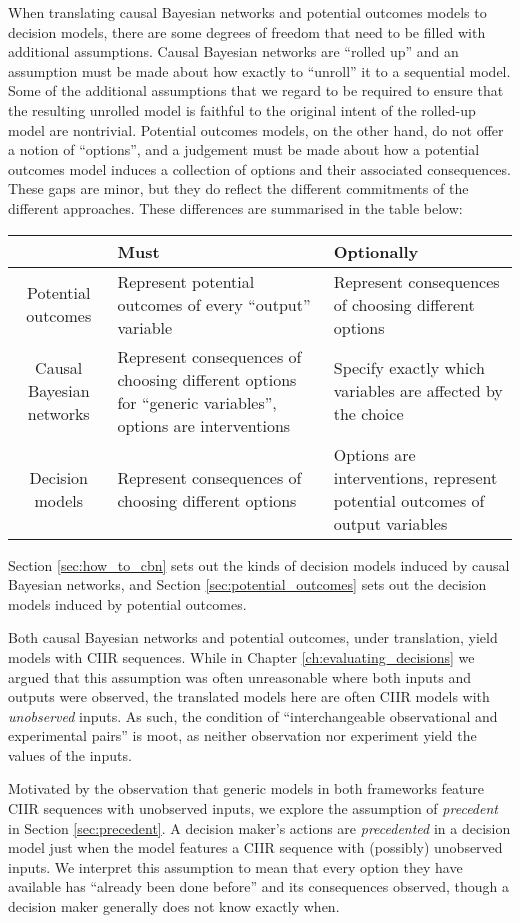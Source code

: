 When translating causal Bayesian networks and potential outcomes models to decision models, there are some degrees of freedom that need to be filled with additional assumptions. Causal Bayesian networks are ``rolled up'' and an assumption must be made about how exactly to ``unroll'' it to a sequential model. Some of the additional assumptions that we regard to be required to ensure that the resulting unrolled model is faithful to the original intent of the rolled-up model are nontrivial. Potential outcomes models, on the other hand, do not offer a notion of ``options'', and a judgement must be made about how a potential outcomes model induces a collection of options and their associated consequences. These gaps are minor, but they do reflect the different commitments of the different approaches. These differences are summarised in the table below:
\begin{center}
\begin{tabular}{ |c|p{5cm}|p{5cm}| } 
 \hline
  & Must & Optionally  \\
 \hline
 Potential outcomes & Represent potential outcomes of every ``output'' variable & Represent consequences of choosing different options \\ 
 Causal Bayesian networks & Represent consequences of choosing different options for ``generic variables'', options are interventions & Specify exactly which variables are affected by the choice \\
 Decision models & Represent consequences of choosing different options & Options are interventions, represent potential outcomes of output variables\\
 \hline
\end{tabular}
\end{center}
Section \ref{sec:how_to_cbn} sets out the kinds of decision models induced by causal Bayesian networks, and Section \ref{sec:potential_outcomes} sets out the decision models induced by potential outcomes.

Both causal Bayesian networks and potential outcomes, under translation, yield models with CIIR sequences. While in Chapter \ref{ch:evaluating_decisions} we argued that this assumption was often unreasonable where both inputs and outputs were observed, the translated models here are often CIIR models with \emph{unobserved} inputs. As such, the condition of ``interchangeable observational and experimental pairs'' is moot, as neither observation nor experiment yield the values of the inputs.

Motivated by the observation that generic models in both frameworks feature CIIR sequences with unobserved inputs, we explore the assumption of \emph{precedent} in Section \ref{sec:precedent}. A decision maker's actions are \emph{precedented} in a decision model just when the model features a CIIR sequence with (possibly) unobserved inputs. We interpret this assumption to mean that every option they have available has ``already been done before'' and its consequences observed, though a decision maker generally does not know exactly when. 

